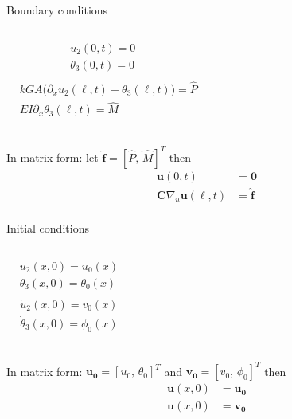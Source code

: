 \documentclass[aspectratio=169]{beamer}
\begin{document}
\begin{frame}
  \begin{block}{Boundary conditions}
    \begin{columns}
      \[
        \begin{aligned}
           & u_2(0, t) = 0 \quad        &  & \\
           & \theta_{3}(0, t) = 0 \quad &  & \\
        \end{aligned}
      \]
      \[
        \begin{aligned}
           & kGA \big(\partial_{x}u_{2}(\ell, t)-\theta_{3}(\ell, t) \big)= \hat P &  & \\
           & EI \partial_{x}\theta_{3}(\ell, t)=\hat M                             &  & \\
        \end{aligned}
      \]
    \end{columns}
    \vspace{.2cm}\small In matrix form: let $\hat{\mathbf{f}}=[\hat P,\, \hat M]^T$ then
    $$\begin{aligned}
        \mathbf u(0,t)                        & =\mathbf 0       \\
        \mathbf C\nabla_{u} \mathbf u(\ell,t) & =\mathbf{\hat f} \\
      \end{aligned}$$
  \end{block}

  \begin{block}{Initial conditions}
    \begin{columns}
      \[
        \begin{aligned}
           & u_2(x, 0) = u_{0}(x) \quad             &  & \\
           & \theta_{3}(x, 0) = \theta_{0}(x) \quad &  & \\
        \end{aligned}
      \]
      \[
        \begin{aligned}
           & \dot u_2(x, 0) = v_{0}(x) \quad           &  & \\
           & \dot \theta_{3}(x, 0) = \phi_{0}(x) \quad &  & \\
        \end{aligned}
      \]
    \end{columns}
    \vspace{.2cm}\small In matrix form:  $\mathbf{u_{0}}=[u_0,\, \theta_0]^T$ and $\mathbf{v_{0}}=[v_0,\, \phi_0]^T$ then
    $$\begin{aligned}
        \mathbf u(x,0)       & =\mathbf{u_{0}} \\
        \mathbf{\dot u}(x,0) & =\mathbf{v_{0}}
      \end{aligned}$$
  \end{block}
\end{frame}
\end{document}
